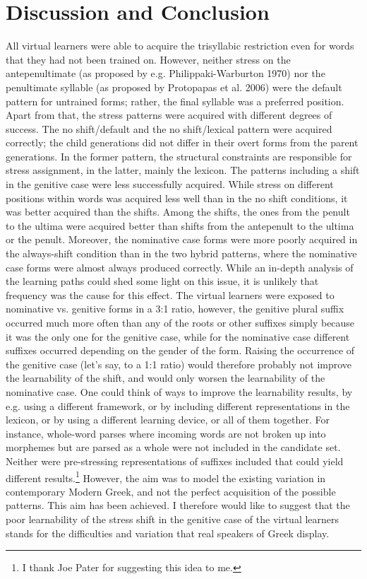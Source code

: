 \documentclass[a4paper]{article}
\begin{document}
\section{
Discussion and Conclusion}

All virtual learners were able to acquire the trisyllabic restriction even for words that they had not been trained on. However, neither stress on the antepenultimate (as proposed by e.g. Philippaki-Warburton 1970) nor the penultimate syllable (as proposed by Protopapas et al. 2006) were the default pattern for untrained forms; rather, the final syllable was a preferred position. Apart from that, the stress patterns were acquired with different degrees of success. The no shift/default and the no shift/lexical pattern were acquired correctly; the child generations did not differ in their overt forms from the parent generations. In the former pattern, the structural constraints are responsible for stress assignment, in the latter, mainly the lexicon. The patterns including a shift in the genitive case were less successfully acquired. While stress on different positions within words was acquired less well than in the no shift conditions, it was better acquired than the shifts. Among the shifts, the ones from the penult to the ultima were acquired better than shifts from the antepenult to the ultima or the penult. Moreover, the nominative case forms were more poorly acquired in the always-shift condition than in the two hybrid patterns, where the nominative case forms were almost always produced correctly. While an in-depth analysis of the learning paths could shed some light on this issue, it is unlikely that frequency was the cause for this effect. The virtual learners were exposed to nominative vs. genitive forms in a 3:1 ratio, however, the genitive plural suffix occurred much more often than any of the roots or other suffixes simply because it was the only one for the genitive case, while for the nominative case different suffixes occurred depending on the gender of the form. Raising the occurrence of the genitive case (let’s say, to a 1:1 ratio) would therefore probably not improve the learnability of the shift, and would only worsen the learnability of the nominative case. One could think of ways to improve the learnability results, by e.g. using a different framework, or by including different representations in the lexicon, or by using a different learning device, or all of them together. For instance, whole-word parses where incoming words are not broken up into morphemes but are parsed as a whole were not included in the candidate set. Neither were pre-stressing representations of suffixes included that could yield different results.\footnote{ I thank Joe Pater for suggesting this idea to me.} However, the aim was to model the existing variation in contemporary Modern Greek, and not the perfect acquisition of the possible patterns. This aim has been achieved. I therefore would like to suggest that the poor learnability of the stress shift in the genitive case of the virtual learners stands for the difficulties and variation that real speakers of Greek display. 
\end{document}
